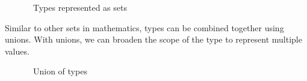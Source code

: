 \begin{figure}[h]
  \centering
  \caption{~Types represented as sets}
\end{figure}

Similar to other sets in mathematics, types can be combined together using unions. With unions, we can broaden the scope of the type to represent multiple values.

\begin{figure}
  \centering
  \caption{~Union of types}
\end{figure}

